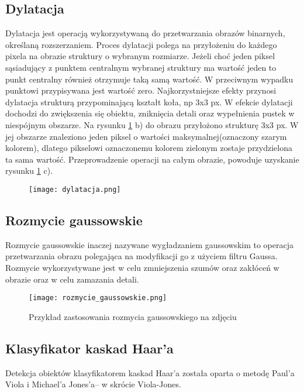 \subsection{Dylatacja}
Dylatacja jest operacją wykorzystywaną do przetwarzania obrazów binarnych, określaną rozszerzaniem. Proces dylatacji polega na przyłożeniu do każdego pixela na obrazie struktury o wybranym rozmiarze. Jeżeli choć jeden piksel sąsiadujący z punktem centralnym wybranej struktury ma wartość jeden to punkt centralny również otrzymuje taką samą wartość. W przeciwnym wypadku punktowi przypisywana jest wartość zero. Najkorzystniejsze efekty przynosi dylatacja strukturą przypominającą kształt koła, np 3x3 px. W efekcie dylatacji dochodzi do zwiększenia się obiektu, zniknięcia detali oraz wypełnienia pustek w niespójnym obszarze. Na rysunku \ref{fig:dylatacja} b) do obrazu przyłożono strukturę 3x3 px. W jej obszarze znaleziono jeden piksel o wartości maksymalnej(oznaczony szarym kolorem), dlatego pikselowi oznaczonemu kolorem zielonym zostaje przydzielona ta sama wartość. Przeprowadzenie operacji na całym obrazie, powoduje uzyskanie rysunku \ref{fig:dylatacja} c).
\begin{figure}[H]
	\centering
	\texttt{[image: dylatacja.png]}
	\label{fig:dylatacja}
\end{figure}

\subsection{Rozmycie gaussowskie}
Rozmycie gaussowskie inaczej nazywane wygładzaniem gaussowskim to operacja przetwarzania obrazu polegająca na modyfikacji go z użyciem filtru Gaussa. Rozmycie wykorzystywane jest w celu zmniejszenia szumów oraz zakłóceń w obrazie oraz w celu zamazania detali.
\begin{figure}[H]
	\centering
	\texttt{[image: rozmycie\_gaussowskie.png]}
	\caption{Przykład zastosowania rozmycia gaussowskiego na zdjęciu}
	\label{fig:rozmycie_gaussowskie}
\end{figure}

\subsection{Klasyfikator kaskad Haar'a} \label{haar}
Detekcja obiektów klasyfikatorem kaskad Haar'a została oparta o metodę Paul'a Viola i Michael'a Jones'a– w skrócie Viola-Jones.

